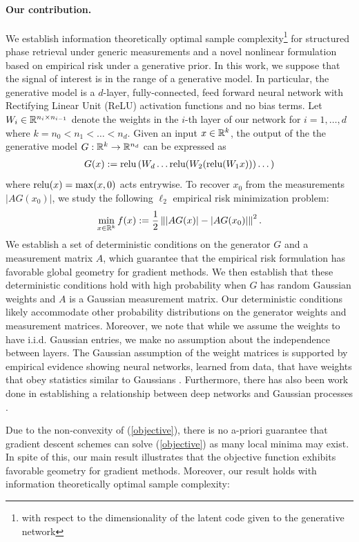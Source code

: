 \documentclass{article}
\begin{document}
\paragraph{Our contribution.} We establish information theoretically optimal sample complexity\footnote{with respect to the dimensionality of the latent code given to the generative network} for structured phase retrieval under generic measurements and a novel nonlinear formulation based on empirical risk under a generative prior. In this work, we suppose that the signal of interest is in the range of a generative model. In particular, the generative model is a $d$-layer, fully-connected, feed forward neural network with Rectifying Linear Unit (ReLU) activation functions and no bias terms. Let $W_i \in \mathbb{R}^{n_i \times n_{i-1}}$ denote the weights in the $i$-th layer of our network for $i = 1,\dots,d$ where $k = n_0 < n_1 < \dots < n_d$. Given an input $x \in \mathbb{R}^k$, the output of the the generative model $G : \mathbb{R}^k \rightarrow \mathbb{R}^{n_d}$ can be expressed as  \begin{align*}
G(x) : = \text{relu}\left(W_d \dots\text{relu}(W_2(\text{relu}(W_1x)))\dots\right)
\end{align*} where $\text{relu}(x) = \max(x,0)$ acts entrywise. To recover $x_0$ from the measurements $|AG(x_0)|$, we study the following $\ell_2$ empirical risk minimization problem: \begin{align} \min_{x \in \mathbb{R}^k} f(x) := \frac{1}{2}\left\||AG(x)| - |AG(x_0)|\right\|^2. \label{objective} \end{align} We establish a set of deterministic conditions on the generator $G$ and a measurement matrix $A$, which guarantee that the empirical risk formulation has favorable global geometry for gradient methods. We then establish that these deterministic conditions hold with high probability when $G$ has random Gaussian weights and $A$ is a Gaussian measurement matrix. Our deterministic conditions likely accommodate other probability distributions on the generator weights and measurement matrices. Moreover, we note that while we assume the weights to have i.i.d. Gaussian entries, we make no assumption about the independence between layers. The Gaussian assumption of the weight matrices is supported by empirical evidence showing neural networks, learned from data, that have weights that obey statistics similar to Gaussians \cite{GaussNets}. Furthermore, there has also been work done in establishing a relationship between deep networks and Gaussian processes \cite{Lee2018}. 

Due to the non-convexity of (\ref{objective}), there is no a-priori guarantee that gradient descent schemes can solve (\ref{objective}) as many local minima may exist. In spite of this, our main result illustrates that the objective function exhibits favorable geometry for gradient methods. Moreover, our result holds with information theoretically optimal sample complexity:
\end{document}
